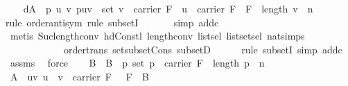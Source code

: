 \begin{isabellebody}
\ \ \isamarkupfalse%
\ d{\isacharcolon}{\kern0pt}{\isachardoublequoteopen}A\ {\isacharequal}{\kern0pt}\ {\isacharbraceleft}{\kern0pt}p{\isachardot}{\kern0pt}\ {\isasymexists}u\ v{\isachardot}{\kern0pt}\ p{\isacharequal}{\kern0pt}u{\isacharhash}{\kern0pt}v\ {\isasymand}\ set\ v\ {\isasymsubseteq}\ carrier\ F\ {\isasymand}\ u\ {\isasymin}\ carrier\ F\ {\isacharminus}{\kern0pt}\ {\isacharbraceleft}{\kern0pt}{\isasymzero}\isactrlbsub F\isactrlesub {\isacharbraceright}{\kern0pt}\ {\isasymand}\ length\ v\ {\isacharequal}{\kern0pt}\ n{\isacharbraceright}{\kern0pt}{\isachardoublequoteclose}\isanewline
\ \ \ \ \isamarkupfalse%
{\isacharparenleft}{\kern0pt}rule\ order{\isacharunderscore}{\kern0pt}antisym{\isacharcomma}{\kern0pt}\ rule\ subsetI{\isacharparenright}{\kern0pt}\isanewline
\ \ \ \ \ \isamarkupfalse%
\ {\isacharparenleft}{\kern0pt}simp\ add{\isacharcolon}{\kern0pt}c{\isacharparenright}{\kern0pt}\ \isanewline
\ \ \ \ \ \isamarkupfalse%
\ {\isacharparenleft}{\kern0pt}metis\ Suc{\isacharunderscore}{\kern0pt}length{\isacharunderscore}{\kern0pt}conv\ hd{\isacharunderscore}{\kern0pt}Cons{\isacharunderscore}{\kern0pt}tl\ length{\isacharunderscore}{\kern0pt}{}{\isacharunderscore}{\kern0pt}conv\ list{\isachardot}{\kern0pt}sel{\isacharparenleft}{\kern0pt}{}{\isacharparenright}{\kern0pt}\ list{\isachardot}{\kern0pt}set{\isacharunderscore}{\kern0pt}sel{\isacharparenleft}{\kern0pt}{}{\isacharparenright}{\kern0pt}\ nat{\isachardot}{\kern0pt}simps{\isacharparenleft}{\kern0pt}{}{\isacharparenright}{\kern0pt}\ \isanewline
\ \ \ \ \ \ \ \ \ \ \ \ order{\isacharunderscore}{\kern0pt}trans\ set{\isacharunderscore}{\kern0pt}subset{\isacharunderscore}{\kern0pt}Cons\ subsetD{\isacharparenright}{\kern0pt}\isanewline
\ \ \ \ \isamarkupfalse%
\ {\isacharparenleft}{\kern0pt}rule\ subsetI{\isacharcomma}{\kern0pt}\ simp\ add{\isacharcolon}{\kern0pt}c{\isacharparenright}{\kern0pt}\ \isamarkupfalse%
\ assms{\isacharparenleft}{\kern0pt}{}{\isacharparenright}{\kern0pt}\ \isamarkupfalse%
\ force\isanewline
\ \ \isamarkupfalse%
\ B\ \ {\isachardoublequoteopen}B\ {\isacharequal}{\kern0pt}\ {\isacharbraceleft}{\kern0pt}p{\isachardot}{\kern0pt}\ set\ p\ {\isasymsubseteq}\ carrier\ F\ {\isasymand}\ length\ p\ {\isacharequal}{\kern0pt}\ n{\isacharbraceright}{\kern0pt}{\isachardoublequoteclose}\isanewline
\ \ \isamarkupfalse%
\ {\isachardoublequoteopen}A\ {\isacharequal}{\kern0pt}\ {\isacharparenleft}{\kern0pt}{\isasymlambda}{\isacharparenleft}{\kern0pt}u{\isacharcomma}{\kern0pt}v{\isacharparenright}{\kern0pt}{\isachardot}{\kern0pt}\ u\ {\isacharhash}{\kern0pt}\ v{\isacharparenright}{\kern0pt}\ {\isacharbackquote}{\kern0pt}\ {\isacharparenleft}{\kern0pt}{\isacharparenleft}{\kern0pt}carrier\ F\ {\isacharminus}{\kern0pt}\ \ {\isacharbraceleft}{\kern0pt}{\isasymzero}\isactrlbsub F\isactrlesub {\isacharbraceright}{\kern0pt}{\isacharparenright}{\kern0pt}\ {\isasymtimes}\ B{\isacharparenright}{\kern0pt}{\isachardoublequoteclose}\isanewline

\end{isabellebody}
